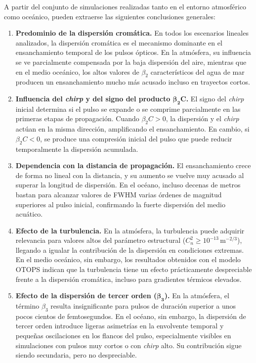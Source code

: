 

A partir del conjunto de simulaciones realizadas tanto en el entorno atmosférico como oceánico, pueden extraerse las siguientes conclusiones generales:

\begin{enumerate}
\item \textbf{Predominio de la dispersión cromática.} En todos los escenarios lineales analizados, la dispersión cromática es el mecanismo dominante en el ensanchamiento temporal de los pulsos ópticos. En la atmósfera, su influencia se ve parcialmente compensada por la baja dispersión del aire, mientras que en el medio oceánico, los altos valores de $\beta_2$ característicos del agua de mar producen un ensanchamiento mucho más acusado incluso en trayectos cortos.

\item \textbf{Influencia del \textit{chirp} y del signo del producto $\boldsymbol{\beta_2 C}$.} El signo del \textit{chirp} inicial determina si el pulso se expande o se comprime parcialmente en las primeras etapas de propagación. Cuando $\beta_2 C > 0$, la dispersión y el \textit{chirp} actúan en la misma dirección, amplificando el ensanchamiento. En cambio, si $\beta_2 C < 0$, se produce una compresión inicial del pulso que puede reducir temporalmente la dispersión acumulada. 

\item \textbf{Dependencia con la distancia de propagación.} El ensanchamiento crece de forma no lineal con la distancia, y su aumento se vuelve muy acusado al superar la longitud de dispersión. En el océano, incluso decenas de metros bastan para alcanzar valores de FWHM varias órdenes de magnitud superiores al pulso inicial, confirmando la fuerte dispersión del medio acuático.

\item \textbf{Efecto de la turbulencia.} En la atmósfera, la turbulencia puede adquirir relevancia para valores altos del parámetro estructural ($C_n^2 \ge 10^{-13}\,\mathrm{m^{-2/3}}$), llegando a igualar la contribución de la dispersión en condiciones extremas. En el medio oceánico, sin embargo, los resultados obtenidos con el modelo OTOPS indican que la turbulencia tiene un efecto prácticamente despreciable frente a la dispersión cromática, incluso para gradientes térmicos elevados.

\item \textbf{Efecto de la dispersión de tercer orden ($\boldsymbol{\beta_3}$).} En la atmósfera, el término $\beta_3$ resulta insignificante para pulsos de duración superior a unos pocos cientos de femtosegundos. En el océano, sin embargo, la dispersión de tercer orden introduce ligeras asimetrías en la envolvente temporal y pequeñas oscilaciones en los flancos del pulso, especialmente visibles en simulaciones con pulsos muy cortos o con \textit{chirp} alto. Su contribución sigue siendo secundaria, pero no despreciable.


\end{enumerate}
